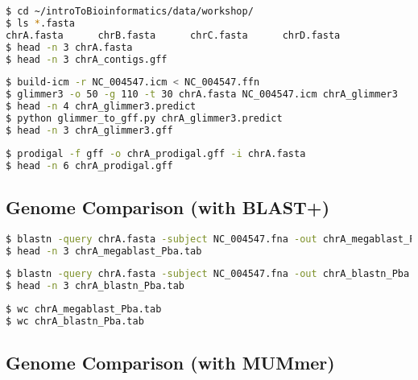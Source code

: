 \documentclass[a4paper]{article}
\begin{document}
\begin{lstlisting}[language=bash]
$ cd ~/introToBioinformatics/data/workshop/
$ ls *.fasta
chrA.fasta      chrB.fasta      chrC.fasta      chrD.fasta
$ head -n 3 chrA.fasta
$ head -n 3 chrA_contigs.gff
\end{lstlisting}


\begin{lstlisting}[language=bash]
$ build-icm -r NC_004547.icm < NC_004547.ffn
$ glimmer3 -o 50 -g 110 -t 30 chrA.fasta NC_004547.icm chrA_glimmer3
$ head -n 4 chrA_glimmer3.predict
$ python glimmer_to_gff.py chrA_glimmer3.predict
$ head -n 3 chrA_glimmer3.gff
\end{lstlisting}

\begin{lstlisting}[language=bash]
$ prodigal -f gff -o chrA_prodigal.gff -i chrA.fasta
$ head -n 6 chrA_prodigal.gff
\end{lstlisting}

\subsection*{Genome Comparison (with BLAST+)}

\begin{lstlisting}[language=bash]
$ blastn -query chrA.fasta -subject NC_004547.fna -out chrA_megablast_Pba.tab -outfmt 6
$ head -n 3 chrA_megablast_Pba.tab
\end{lstlisting}

\begin{lstlisting}[language=bash]
$ blastn -query chrA.fasta -subject NC_004547.fna -out chrA_blastn_Pba.tab -outfmt 6 -task blastn
$ head -n 3 chrA_blastn_Pba.tab
\end{lstlisting}

\begin{lstlisting}[language=bash]
$ wc chrA_megablast_Pba.tab
$ wc chrA_blastn_Pba.tab
\end{lstlisting}


\subsection*{Genome Comparison (with MUMmer)}
\end{document}
